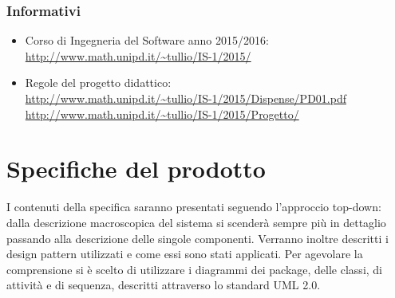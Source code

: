\documentclass[a4paper,11pt]{article}
\begin{document}
		\subsubsection{Informativi}
		\begin{itemize}
			\item Corso di Ingegneria del Software anno 2015/2016:\\
			\url{http://www.math.unipd.it/~tullio/IS-1/2015/}
			\item Regole del progetto didattico:\\
			\url{http://www.math.unipd.it/~tullio/IS-1/2015/Dispense/PD01.pdf}
			\url{http://www.math.unipd.it/~tullio/IS-1/2015/Progetto/}\\
			\end{itemize}
	\pagebreak
	\newpage
	\section{Specifiche del prodotto}
	I contenuti della specifica saranno presentati seguendo l'approccio top-down: dalla descrizione macroscopica del sistema si scenderà sempre più in dettaglio passando alla descrizione delle singole componenti. Verranno inoltre descritti i design pattern utilizzati e come essi sono stati applicati. Per agevolare la comprensione si è scelto di utilizzare i diagrammi dei package, delle classi, di attività e di sequenza, descritti attraverso lo standard UML 2.0.
	
\end{document}
